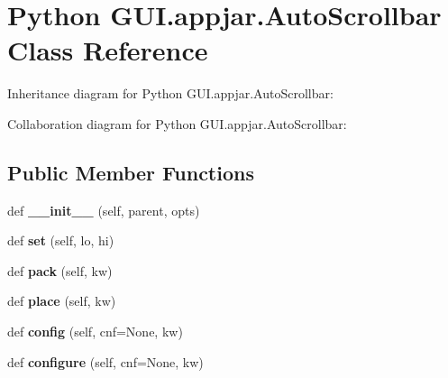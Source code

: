 \hypertarget{class_python_01_g_u_i_1_1appjar_1_1_auto_scrollbar}{}\section{Python G\+U\+I.\+appjar.\+Auto\+Scrollbar Class Reference}
\label{class_python_01_g_u_i_1_1appjar_1_1_auto_scrollbar}


Inheritance diagram for Python G\+U\+I.\+appjar.\+Auto\+Scrollbar\+:


Collaboration diagram for Python G\+U\+I.\+appjar.\+Auto\+Scrollbar\+:
\subsection*{Public Member Functions}
\begin{DoxyCompactItemize}
\item 
\mbox{\label{class_python_01_g_u_i_1_1appjar_1_1_auto_scrollbar_a5c4d678b0a88f8b1451f60a70a5186bc}} 
def {\bfseries \+\_\+\+\_\+init\+\_\+\+\_\+} (self, parent, opts)
\item 
\mbox{\label{class_python_01_g_u_i_1_1appjar_1_1_auto_scrollbar_a0f87766f3d9b980135b69ace101a231b}} 
def {\bfseries set} (self, lo, hi)
\item 
\mbox{\label{class_python_01_g_u_i_1_1appjar_1_1_auto_scrollbar_ae405f1654f00df41651d85c44c10d07d}} 
def {\bfseries pack} (self, kw)
\item 
\mbox{\label{class_python_01_g_u_i_1_1appjar_1_1_auto_scrollbar_a087c94fe8db1e2769bfd7454c1e930f2}} 
def {\bfseries place} (self, kw)
\item 
\mbox{\label{class_python_01_g_u_i_1_1appjar_1_1_auto_scrollbar_aea4ea6ee7e14f269576afdc33b278e70}} 
def {\bfseries config} (self, cnf=None, kw)
\item 
\mbox{\label{class_python_01_g_u_i_1_1appjar_1_1_auto_scrollbar_a60136900ac5934f7bfb5adccca15ba7b}} 
def {\bfseries configure} (self, cnf=None, kw)
\end{DoxyCompactItemize}
